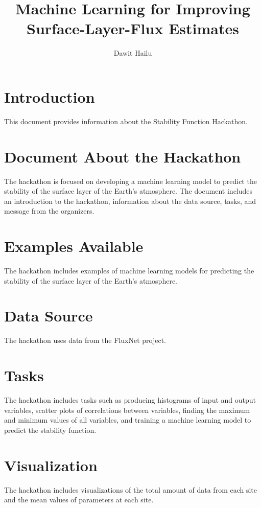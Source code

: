 \documentclass{article}
\title{Machine Learning for Improving Surface-Layer-Flux Estimates}
\author{Dawit Hailu}
\begin{document}
\maketitle

\section{Introduction}

This document provides information about the Stability Function Hackathon.

\section{Document About the Hackathon}

The hackathon is focused on developing a machine learning model to predict the stability of the surface layer of the Earth's atmosphere. The document includes an introduction to the hackathon, information about the data source, tasks, and message from the organizers.

\section{Examples Available}

The hackathon includes examples of machine learning models for predicting the stability of the surface layer of the Earth's atmosphere.

\section{Data Source}

The hackathon uses data from the FluxNet project.

\section{Tasks}

The hackathon includes tasks such as producing histograms of input and output variables, scatter plots of correlations between variables, finding the maximum and minimum values of all variables, and training a machine learning model to predict the stability function.

\section{Visualization}

The hackathon includes visualizations of the total amount of data from each site and the mean values of parameters at each site.
\end{document}
